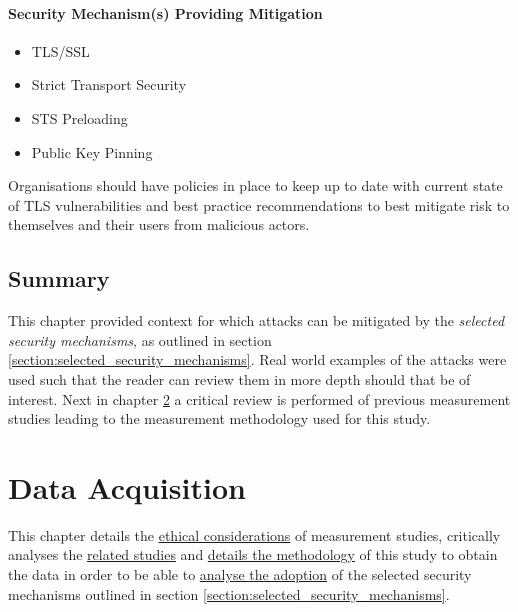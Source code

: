 \documentclass{mscreport}
\begin{document}
\subsubsection{Security Mechanism(s) Providing Mitigation}

\begin{itemize}
	\setlength\itemsep{0.1em}
	\item TLS/SSL
	\item Strict Transport Security
	\item STS Preloading
	\item Public Key Pinning
\end{itemize}

\noindent
Organisations should have policies in place to keep up to date with current state of TLS vulnerabilities and best practice recommendations to best mitigate risk to themselves and their users from malicious actors.
\clearpage
\newpage

%


\section{Summary}

This chapter provided context for which attacks can be mitigated by the \textit{selected security mechanisms}, as outlined in section \ref{section:selected_security_mechanisms}. Real world examples of the attacks were used such that the reader can review them in more depth should that be of interest. Next in chapter \ref{chap:data_acqusition} a critical review is performed of previous measurement studies leading to the measurement methodology used for this study.


\chapter{Data Acquisition}
\label{chap:data_acqusition}

This chapter details the \hyperref[section:ethics]{ethical considerations} of measurement studies, critically analyses the \hyperref[section:lit_review]{related studies} and \hyperref[section:methodology]{details the methodology} of this study to obtain the data in order to be able to \hyperref[chap:analysis]{analyse the adoption} of the selected security mechanisms outlined in section \ref{section:selected_security_mechanisms}.
\end{document}
